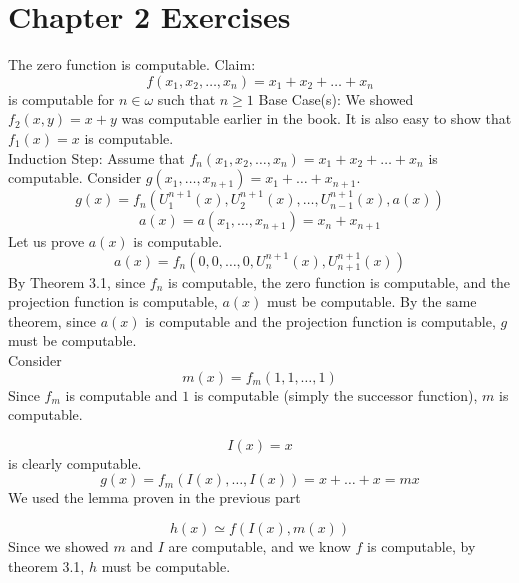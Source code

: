 
\section{Chapter 2 Exercises}

\begin{exe}[3.4.1a]
The zero function is computable.
Claim:
\[f(x_1, x_2, \ldots, x_n) = x_1 + x_2 + \ldots + x_n\]
is computable for $n \in \omega$ such that $n \geq 1$
Base Case(s): We showed $f_2(x, y) = x+y$ was computable earlier in the book. It is also
easy to show that $f_1(x) = x$ is computable.\\
Induction Step: Assume that $f_n(x_1, x_2, \ldots, x_n) = x_1 + x_2 + \ldots + x_n$ is
computable. Consider $g(x_1, \ldots, x_{n+1}) = x_1 + \ldots + x_{n+1}$. 
\[g(x) = f_n(U_1^{n+1}(x), U_2^{n+1}(x), \ldots, U_{n-1}^{n+1}(x), a(x))\]
\[a(x) = a(x_1, \ldots, x_{n+1}) = x_n + x_{n+1}\]
Let us prove $a(x)$ is computable.
\[a(x) = f_n(0, 0, \ldots, 0, U_n^{n+1}(x), U_{n+1}^{n+1}(x))\]
By Theorem 3.1, since $f_n$ is computable, the zero function is computable,
and the projection function is computable, $a(x)$ must be computable. By the same theorem, since $a(x)$
is computable and the projection function is computable, $g$ must be computable.\\
Consider
\[m(x) = f_m(1, 1, \ldots, 1)\]
Since $f_m$ is computable and $1$ is computable (simply the successor function), 
$m$ is computable.
\end{exe}
\begin{exe}[3.4.1b]
\[I(x) = x\]
is clearly computable. 
\[g(x) = f_m(I(x), \ldots, I(x)) = x + \ldots + x = mx\]
We used the lemma proven in the previous part
\end{exe}
\begin{exe}[3.4.2]
\[h(x) \simeq f(I(x), m(x))\]
Since we showed $m$ and $I$ are computable, and we know $f$ is computable,
by theorem 3.1, $h$ must be computable.
\end{exe}
